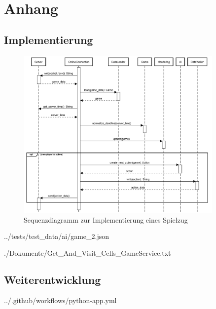 \chapter{Anhang}
\label{ch:anhang}

\section{Implementierung}
\label{sec:anhang-implementierung}

\begin{figure}[htb]
	\centering
	\includegraphics[width=0.9\textwidth]{Bilder/Sequenzdiagramm_Implementierung_Spielzug.png}
	\caption{Sequenzdiagramm zur Implementierung eines Spielzug}
	\label{fig:sequenzdiagramm-spielzug}
\end{figure}

\begin{minipage}{\textwidth}
	
	{../tests/test_data/ai/game_2.json}
\end{minipage}

\begin{minipage}{\textwidth}
	
	{./Dokumente/Get_And_Visit_Cells_GameService.txt}
\end{minipage}

\section{Weiterentwicklung}
\label{sec:anhang-weiterentwicklung}

\begin{minipage}{\textwidth}
	
	{../.github/workflows/python-app.yml}
\end{minipage}
